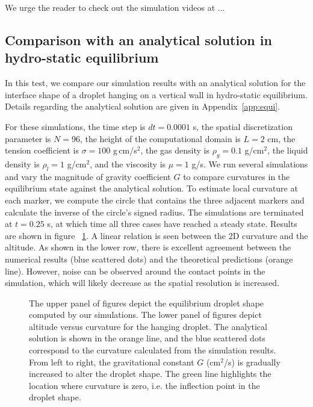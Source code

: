 \documentclass{jfm}
\newcommand{\daniel}[1]{\todo[inline,color=yellow!40]{Daniel: #1}}
\begin{document}
We urge the reader to check out the simulation videos at ...
\daniel{remember to add videos}

\subsection {Comparison with an analytical solution in hydro-static equilibrium}\label{subsec:equi}
In this test, we compare our simulation results with an analytical solution for the interface shape of a droplet hanging on a vertical wall in hydro-static equilibrium. Details regarding the analytical solution are given in Appendix~\ref{app:equi}. 

For these simulations, the time step is $dt=0.0001$ s, the spatial discretization parameter is $N=96$, the height of the computational domain is $L=2$ cm, the tension coefficient is $\sigma=100$ g\,cm/s$^2$, the gas density is $\rho_g=0.1$ g/cm$^2$, the liquid density is $\rho_l=1$ g/cm$^2$, and the viscosity is $\mu=1$ g/s. We run several simulations and vary the magnitude of gravity coefficient $G$ to compare curvatures in the equilibrium state against the analytical solution. To estimate local curvature at each marker, we compute the circle that contains the three adjacent markers and calculate the inverse of the circle's signed radius. The simulations are terminated at $t = 0.25$ s, at which time all three cases have reached a steady state. Results are shown in figure ~\ref{fig:h-curvature}. A linear relation is seen between the 2D curvature and the altitude. As shown in the lower row, there is excellent agreement between the numerical results (blue scattered dots) and the theoretical predictions (orange line). However, noise can be observed around the contact points in the simulation, which will likely decrease as the spatial resolution is increased.
    
\begin{figure}
\caption{\label{fig:h-curvature} The upper panel of figures depict the equilibrium droplet shape computed by our simulations. The lower panel of figures depict altitude versus curvature for the hanging droplet. The analytical solution is shown in the orange line, and the blue scattered dots correspond to the curvature calculated from the simulation results. From left to right, the gravitational constant $G$ (cm$^2$/s) is gradually increased to alter the droplet shape. The green line highlights the location where curvature is zero, i.e. the inflection point in the droplet shape.}
\end{figure}
\end{document}
